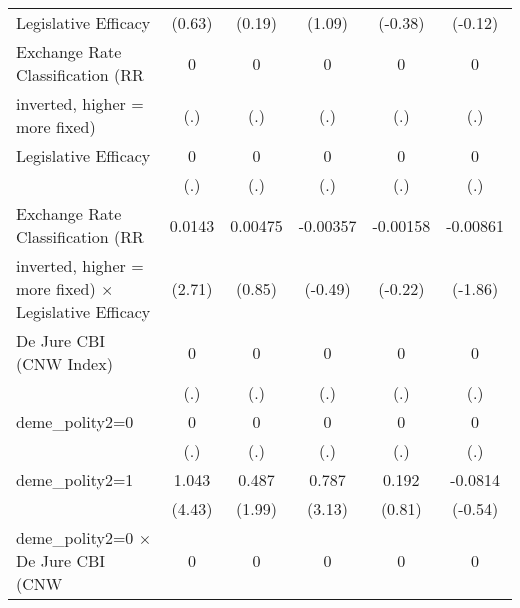 \begin{table}[htbp]
\begin{tabular}{l*{5}{c}}
Legislative Efficacy                    &   (0.63)         &   (0.19)         &   (1.09)         &  (-0.38)         &  (-0.12)         \\
\addlinespace
Exchange Rate Classification (RR        &        0         &        0         &        0         &        0         &        0         \\
inverted, higher = more fixed)          &      (.)         &      (.)         &      (.)         &      (.)         &      (.)         \\
\addlinespace
Legislative Efficacy                    &        0         &        0         &        0         &        0         &        0         \\
                                        &      (.)         &      (.)         &      (.)         &      (.)         &      (.)         \\
\addlinespace
Exchange Rate Classification (RR        &   0.0143\sym{**} &  0.00475         & -0.00357         & -0.00158         & -0.00861         \\
inverted, higher = more fixed) $\times$ Legislative Efficacy&   (2.71)         &   (0.85)         &  (-0.49)         &  (-0.22)         &  (-1.86)         \\
\addlinespace
De Jure CBI (CNW Index)                 &        0         &        0         &        0         &        0         &        0         \\
                                        &      (.)         &      (.)         &      (.)         &      (.)         &      (.)         \\
\addlinespace
deme\_polity2=0                          &        0         &        0         &        0         &        0         &        0         \\
                                        &      (.)         &      (.)         &      (.)         &      (.)         &      (.)         \\
\addlinespace
deme\_polity2=1                          &    1.043\sym{***}&    0.487\sym{*}  &    0.787\sym{**} &    0.192         &  -0.0814         \\
                                        &   (4.43)         &   (1.99)         &   (3.13)         &   (0.81)         &  (-0.54)         \\
\addlinespace
deme\_polity2=0 $\times$ De Jure CBI (CNW&        0         &        0         &        0         &        0         &        0         \\

\end{tabular}
\end{table}
